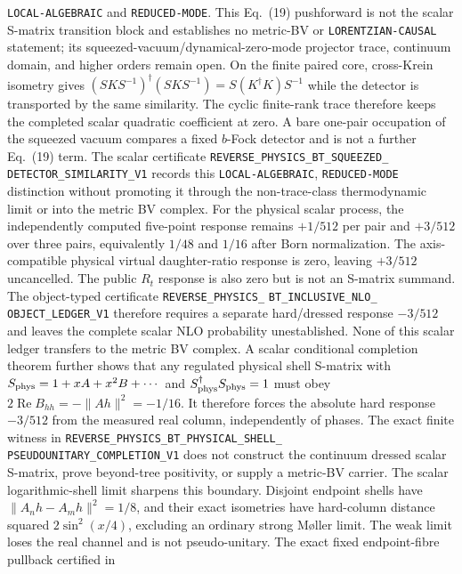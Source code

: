 \documentclass[11pt]{article}
\theoremstyle{definition}
\theoremstyle{remark}
\begin{document}
\texttt{LOCAL-ALGEBRAIC} and \texttt{REDUCED-MODE}.  This Eq.~(19)
pushforward is not the scalar S-matrix transition block and establishes no
metric-BV or \texttt{LORENTZIAN-CAUSAL} statement; its
squeezed-vacuum/dynamical-zero-mode projector trace, continuum domain, and
higher orders remain open.
On the finite paired core, cross-Krein isometry gives
$(SKS^{-1})^\dagger(SKS^{-1})=S(K^\dagger K)S^{-1}$ while the detector is
transported by the same similarity.  The cyclic finite-rank trace therefore
keeps the completed scalar quadratic coefficient at zero.  A bare one-pair
occupation of the squeezed vacuum compares a fixed $b$-Fock detector and is
not a further Eq.~(19) term.  The scalar certificate
\texttt{REVERSE\_PHYSICS\_BT\_SQUEEZED\_}
\allowbreak\texttt{DETECTOR\_SIMILARITY\_V1} records this
\texttt{LOCAL-ALGEBRAIC}, \texttt{REDUCED-MODE} distinction without promoting
it through the non-trace-class thermodynamic limit or into the metric BV
complex.
For the physical scalar process, the independently computed five-point
response remains $+1/512$ per pair and $+3/512$ over three pairs, equivalently
$1/48$ and $1/16$ after Born normalization.  The axis-compatible physical
virtual daughter-ratio response is zero, leaving $+3/512$ uncancelled.  The
public $R_t$ response is also zero but is not an S-matrix summand.  The
object-typed certificate
\texttt{REVERSE\_PHYSICS\_}
\allowbreak\texttt{BT\_INCLUSIVE\_NLO\_}
\allowbreak\texttt{OBJECT\_LEDGER\_V1} therefore requires a separate
hard/dressed response $-3/512$ and leaves the complete scalar NLO probability
unestablished.  None of this scalar ledger transfers to the metric BV complex.
A scalar conditional completion theorem further shows that any regulated
physical shell S-matrix with
$S_{\rm phys}=1+xA+x^2B+\cdots$ and $S_{\rm phys}^\dagger S_{\rm phys}=1$
must obey $2\operatorname{Re}B_{hh}=-\|Ah\|^2=-1/16$.  It therefore forces
the absolute hard response $-3/512$ from the measured real column, independently
of phases.  The exact finite witness in
\texttt{REVERSE\_PHYSICS\_BT\_PHYSICAL\_SHELL\_}
\allowbreak\texttt{PSEUDOUNITARY\_COMPLETION\_V1} does not construct the
continuum dressed scalar S-matrix, prove beyond-tree positivity, or supply a
metric-BV carrier.
The scalar logarithmic-shell limit sharpens this boundary.  Disjoint endpoint
shells have $\|A_nh-A_mh\|^2=1/8$, and their exact isometries have hard-column
distance squared $2\sin^2(x/4)$, excluding an ordinary strong Møller limit.
The weak limit loses the real channel and is not pseudo-unitary.  The exact
fixed endpoint-fibre pullback certified in
\end{document}
